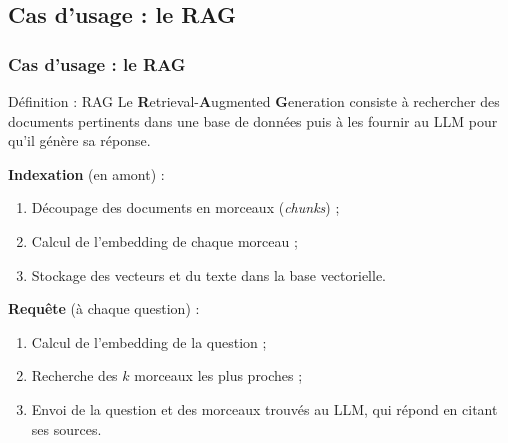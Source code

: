     \subsection{Cas d'usage : le RAG}
    \begin{frame}
        \frametitle{Cas d'usage : le RAG}

        \begin{block}{Définition : RAG}
            Le \textbf{R}etrieval-\textbf{A}ugmented \textbf{G}eneration consiste à rechercher des documents pertinents dans une base de données puis à les fournir au LLM pour qu'il génère sa réponse.
        \end{block}

        \small
        \textbf{Indexation} (en amont) :
        \begin{enumerate}
            \small
            \item Découpage des documents en morceaux (\textit{chunks}) ;
            \item Calcul de l'embedding de chaque morceau ;
            \item Stockage des vecteurs et du texte dans la base vectorielle.
        \end{enumerate}

        \textbf{Requête} (à chaque question) :
        \begin{enumerate}
            \small
            \item Calcul de l'embedding de la question ;
            \item Recherche des $k$ morceaux les plus proches ;
            \item Envoi de la question et des morceaux trouvés au LLM, qui répond en citant ses sources.
        \end{enumerate}
    \end{frame}

